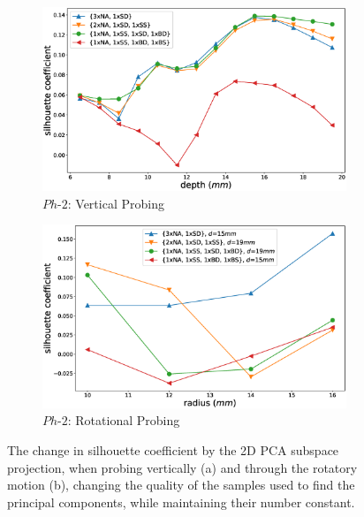 \begin{figure}[]
	\centering
	\begin{subfigure}[b]{\columnwidth}
		\includegraphics[width=\columnwidth]{./figs/silhouette_coefficient_vertical_quality.eps}
		\caption{$Ph\text{-}2$: Vertical Probing}
		\label{silhouette_quality:vertical}
	\end{subfigure}
	\begin{subfigure}[b]{\columnwidth}
		\includegraphics[width=\columnwidth]{./figs/silhouette_coefficient_rotation_quality.eps}
		\caption{$Ph\text{-}2$: Rotational Probing}
		\label{silhouette_quality:Rotation}
	\end{subfigure}
	\caption{The change in silhouette coefficient by the 2D PCA subspace projection, 
		when probing vertically (a) and through the rotatory motion (b), changing the quality of the 
		samples used to find the principal components, while maintaining their number constant. }
	\label{silhouette_quality}
\end{figure}
